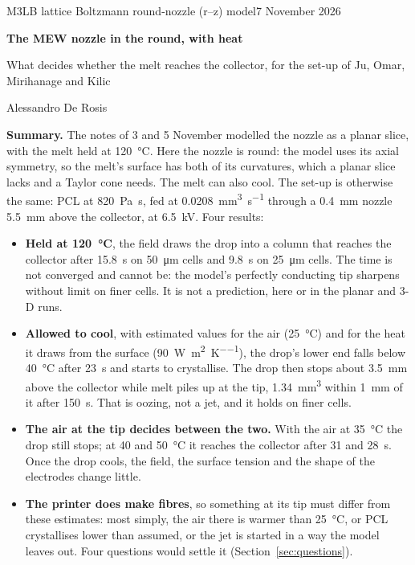 \documentclass[10pt,a4paper]{article}
\begin{document}
{\sffamily\footnotesize\color{inkthree}M3LB \textperiodcentered{} lattice Boltzmann \textperiodcentered{} round-nozzle (r--z) model\hfill 7 November 2026\par}
\vspace{6pt}
{\sffamily\bfseries\LARGE The MEW nozzle in the round, with heat\par}
\vspace{3pt}
{\sffamily\large\color{inktwo}What decides whether the melt reaches the collector, for the set-up of Ju, Omar, Mirihanage and Kilic\par}
\vspace{3pt}
{\small Alessandro De Rosis\par}
\vspace{8pt}

\textbf{Summary.} The notes of 3 and 5 November modelled the nozzle as a planar slice, with the melt held at
\qty{120}{\celsius}. Here the nozzle is round: the model uses its axial symmetry, so the melt's surface has
both of its curvatures, which a planar slice lacks and a Taylor cone needs. The melt can also cool. The set-up is
otherwise the same: PCL at \qty{820}{\pascal\second}, fed at \qty{0.0208}{\cubic\milli\metre\per\second}
through a \qty{0.4}{\milli\metre} nozzle \qty{5.5}{\milli\metre} above the collector, at \qty{6.5}{\kilo\volt}.
Four results:
\begin{itemize}
  \item \textbf{Held at \qty{120}{\celsius}}, the field draws the drop into a column that reaches the collector
    after \qty{15.8}{\second} on \qty{50}{\micro\metre} cells and \qty{9.8}{\second} on \qty{25}{\micro\metre}
    cells. The time is not converged and cannot be: the model's perfectly conducting tip sharpens without limit
    on finer cells. It is not a prediction, here or in the planar and 3-D runs.
  \item \textbf{Allowed to cool}, with estimated values for the air (\qty{25}{\celsius}) and for the heat it
    draws from the surface (\qty{90}{\watt\per\square\metre\per\kelvin}), the drop's lower end falls below
    \qty{40}{\celsius} after \qty{23}{\second} and starts to crystallise. The drop then stops about
    \qty{3.5}{\milli\metre} above the collector while melt piles up at the tip,
    \qty{1.34}{\cubic\milli\metre} within \qty{1}{\milli\metre} of it after \qty{150}{\second}. That is
    oozing, not a jet, and it holds on finer cells.
  \item \textbf{The air at the tip decides between the two.} With the air at \qty{35}{\celsius} the drop
    still stops; at 40 and \qty{50}{\celsius} it reaches the collector after 31 and \qty{28}{\second}. Once
    the drop cools, the field, the surface tension and the shape of the electrodes change little.
  \item \textbf{The printer does make fibres}, so something at its tip must differ from these estimates: most
    simply, the air there is warmer than \qty{25}{\celsius}, or PCL crystallises lower than assumed, or the
    jet is started in a way the model leaves out. Four questions would settle it
    (Section~\ref{sec:questions}).
\end{itemize}
\end{document}
